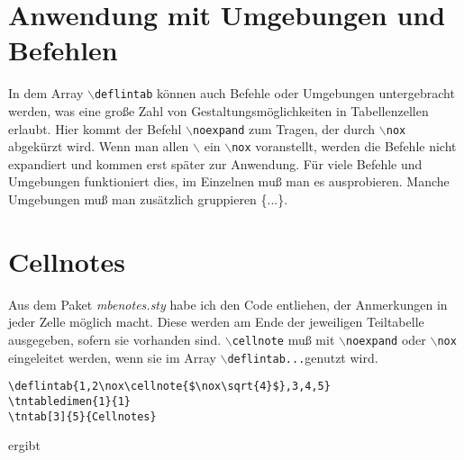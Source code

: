 \documentclass[10pt,a4paper]{article}%
\begin{document}
\section{Anwendung mit Umgebungen und Befehlen}
In dem Array \texttt{$\backslash$deflintab} können auch Befehle oder Umgebungen untergebracht werden, was
eine große Zahl von Gestaltungsmöglichkeiten in Tabellenzellen erlaubt. Hier
kommt der Befehl \texttt{$\backslash$noexpand} zum Tragen, der durch
\texttt{$\backslash$nox} abgekürzt wird. Wenn man allen
\texttt{$\backslash$} ein
\texttt{$\backslash$nox} voranstellt, werden die Befehle nicht expandiert und
kommen erst später zur Anwendung. Für viele Befehle und Umgebungen
funktioniert dies, im Einzelnen muß man es ausprobieren. Manche Umgebungen muß
man zusätzlich gruppieren \{...\}.
\section{Cellnotes}
Aus dem Paket \textsl{mbenotes.sty} habe ich den Code entliehen, der Anmerkungen in jeder
Zelle möglich macht. Diese werden am Ende der jeweiligen Teiltabelle
ausgegeben, sofern sie vorhanden sind. \texttt{$\backslash$cellnote{}} muß mit
\texttt{$\backslash$noexpand} oder \texttt{$\backslash$nox}
eingeleitet werden, wenn sie im Array \texttt{$\backslash$deflintab{...}}genutzt wird.
\begin{verbatim}
\deflintab{1,2\nox\cellnote{$\nox\sqrt{4}$},3,4,5}
\tntabledimen{1}{1}
\tntab[3]{5}{Cellnotes}
\end{verbatim} ergibt
\end{document}

